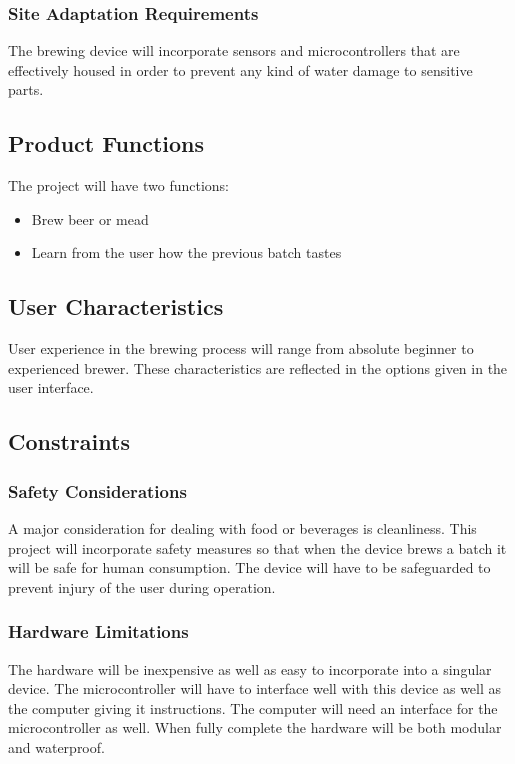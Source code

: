 \documentclass[draftclsnofoot,onecolumn,letterpaper,10pt]{IEEEtran}
\begin{document}
\subsubsection{Site Adaptation Requirements}
The brewing device will incorporate sensors and microcontrollers that are effectively housed
in order to prevent any kind of water damage to sensitive parts.

\subsection{Product Functions}
The project will have two functions:
\begin{itemize}
	\item Brew beer or mead
	\item Learn from the user how the previous batch tastes
\end{itemize}

\subsection{User Characteristics}
User experience in the brewing process will range from absolute beginner to experienced brewer.
These characteristics are reflected in the options given in the user interface.

\subsection{Constraints}
\subsubsection{Safety Considerations}
A major consideration for dealing with food or beverages is cleanliness.
This project will incorporate safety measures so that when the device brews a batch it will be safe for human consumption.
The device will have to be safeguarded to prevent injury of the user during operation.
\subsubsection{Hardware Limitations}
The hardware will be inexpensive as well as easy to incorporate into a singular device.
The microcontroller will have to interface well with this device as well as the computer giving it instructions.
The computer will need an interface for the microcontroller as well.
When fully complete the hardware will be both modular and waterproof.
\end{document}
